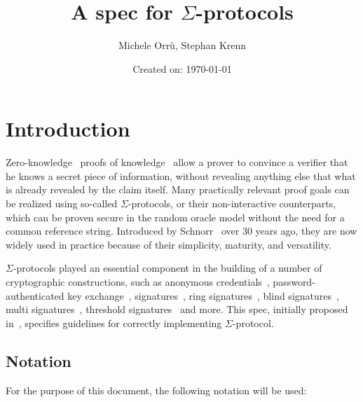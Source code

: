 \documentclass[11pt]{article}
\title{A spec for $\Sigma$-protocols}
\date{Created on: \today}
\author{Michele Orrù, Stephan Krenn}
\begin{document}
%
\maketitle              %
%
{\hypersetup{hidelinks} \tableofcontents}

\section{Introduction}

Zero-knowledge~\cite{GolMicRac89} proofs of knowledge~\cite{C:BelGol92} allow a prover to convince a verifier that he knows a secret piece of information, without revealing anything else that what is already revealed by the claim itself.
Many practically relevant proof goals can be realized using so-called $\Sigma$-protocols, or their non-interactive counterparts, which can be proven secure in the random oracle model without the need for a common reference string.
Introduced by Schnorr~\cite{JC:Schnorr91} over 30 years ago, they are now widely used  in practice because of their simplicity, maturity, and versatility.

$\Sigma$-protocols played an essential component in the building of a number of cryptographic
constructions,
such as anonymous credentials~\cite{CCS:ChaMeiZav14}, password-authenticated key exchange~\cite{jpake}, signatures~\cite{C:Schnorr89},
ring signatures~\cite{borromeansig}, blind signatures~\cite{CCS:PoiSte97}, multi signatures~\cite{CCS:NRSW20}, threshold signatures~\cite{EPRINT:KomGol20} and more. This spec, initially proposed in~\cite{sigma-zkp4}, specifies guidelines for correctly implementing $\Sigma$-protocol.

\subsection{Notation}
\label{sec:notation}

For the purpose of this document, the following notation will be used:
\end{document}
